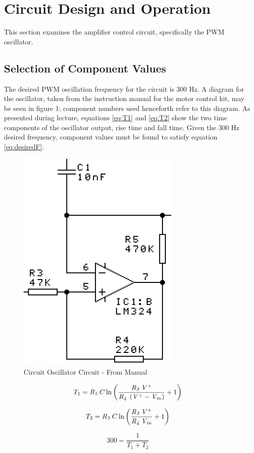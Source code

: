 \section{Circuit Design and Operation}

This section examines the amplifier control circuit, specifically the PWM oscillator.


\subsection{Selection of Component Values}

The desired PWM oscillation frequency for the circuit is 300 Hz.
A diagram for the oscillator, taken from the instruction manual for the motor control kit, may be seen in figure 1; component numbers used henceforth refer to this diagram.
As presented during lecture, equations \ref{eq:T1} and \ref{eq:T2} show the two time components of the oscillator output, rise time and fall time.
Given the 300 Hz desired frequency, component values must be found to satisfy equation \ref{eq:desiredF}.
 
\begin{figure}[h]
    \label{fig:oscillatorcapture}
    \centering
    \includegraphics[width=.22\textwidth,bb=0 0 300 419]{images/OscillatorCapture.PNG}
    \caption{Circuit Oscillator Circuit - From Manual}
\end{figure}
 
\begin{equation}
	\label{eq:T1}
	T_1 = {\it R_5}\,C\ln  \left( {\frac {{\it R_3}\,{\it V^+}}{{\it R_4}\, \left( {
\it V^+}-{\it V_{in}} \right) }}+1 \right) 
\end{equation}

\begin{equation}
	\label{eq:T2}
	T_2 = {\it R_5}\,C\ln  \left( {\frac {{\it R_3}\,{\it V^+}}{{\it R_4}\,{\it V_{in}}}
}+1 \right) 
\end{equation}

\begin{equation}
	\label{eq:desiredF}
	300= {\frac {1}{T_1 + T_2}}
\end{equation}

